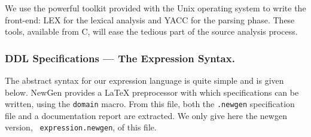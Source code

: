 We use the powerful toolkit provided with the Unix operating system to
write the front-end: LEX for the lexical analysis and YACC for the
parsing phase. These tools, available from C, will ease the tedious part
of the source analysis process. 

\subsubsection*{DDL Specifications --- The Expression Syntax.}

The abstract syntax for our expression language is quite simple and is
given below. NewGen provides a LaTeX preprocessor with which
specifications can be written, using the {\tt domain} macro.  From this
file, both the {\tt .newgen} specification file and a documentation
report are extracted. We only give here the newgen version, {\tt
expression.newgen}, of this file.

